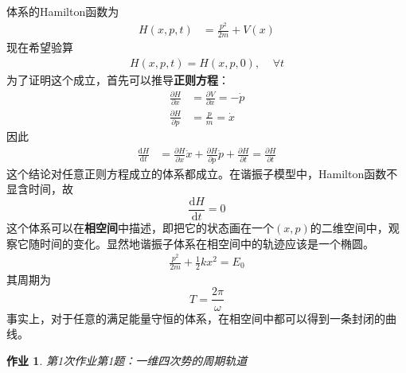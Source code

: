 \documentclass[12pt]{article}
\newtheorem{asg}{作业}
\begin{document}
    体系的Hamilton函数为
    \begin{equation}\begin{aligned}
        H(x,p,t) &= \frac {p^2}{2m} + V(x)
    \end{aligned}\end{equation}
    现在希望验算
    \begin{equation}\begin{aligned}
        H(x,p,t) = H(x,p,0),~~~~~\forall t
    \end{aligned}\end{equation}
    为了证明这个成立，首先可以推导\textbf{正则方程}：
    \begin{equation}\begin{aligned}
        \frac {\partial H}{\partial x} &= \frac {\partial V}{\partial x} = -\dot{p}\\
        \frac {\partial H}{\partial p} &= \frac pm = \dot{x}
    \end{aligned}\end{equation}
    因此
    \begin{equation}\begin{aligned}
        \frac {\mathrm{d}H}{\mathrm{d}t} &= \frac {\partial H}{\partial x} \dot{x} + \frac {\partial H}{\partial p} \dot{p} + \frac {\partial H}{\partial t} = \frac {\partial H}{\partial t}
    \end{aligned}\end{equation}
    这个结论对任意正则方程成立的体系都成立。在谐振子模型中，Hamilton函数不显含时间，故
    \begin{equation}
        \frac {\mathrm{d}H}{\mathrm{d}t} = 0
    \end{equation}
    这个体系可以在\textbf{相空间}中描述，即把它的状态画在一个$(x,p)$的二维空间中，观察它随时间的变化。显然地谐振子体系在相空间中的轨迹应该是一个椭圆。
    \begin{equation}\begin{aligned}
        \frac {p^2}{2m} + \frac 12 kx^2 = E_0
    \end{aligned}\end{equation}
    其周期为
    \begin{equation}
        T = \frac {2\pi}{\omega}
    \end{equation}
    事实上，对于任意的满足能量守恒的体系，在相空间中都可以得到一条封闭的曲线。
    \begin{asg}
        第1次作业第1题：一维四次势的周期轨道
    \end{asg}
\end{document}
